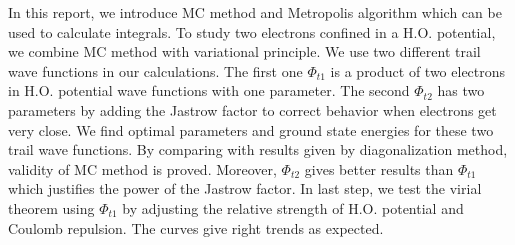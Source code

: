 In this report, we introduce MC method and Metropolis algorithm which can be used to calculate integrals.
To study two electrons confined in a H.O. potential, we combine MC method with variational principle.
We use two different trail wave functions in our calculations.
The first one $\Phi_{t1}$ is a product of two electrons in H.O. potential wave functions with one parameter.
The second $\Phi_{t2}$ has two parameters by adding the Jastrow factor to correct behavior when electrons get very close.
We find optimal parameters and ground state energies for these two trail wave functions.
By comparing with results given by diagonalization method, validity of MC method is proved.
Moreover, $\Phi_{t2}$ gives better results than $\Phi_{t1}$ which justifies the power of the Jastrow factor.
In last step, we test the virial theorem using $\Phi_{t1}$ by adjusting the relative strength of H.O. potential and Coulomb repulsion.
The curves give right trends as expected.